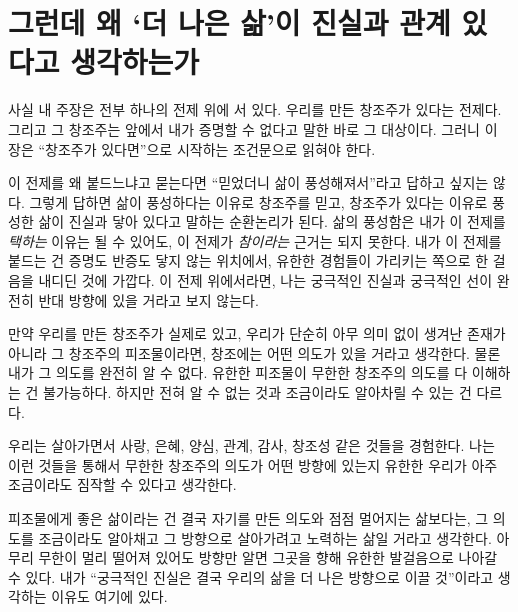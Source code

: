 \documentclass[11pt]{article}
\begin{document}
\section{그런데 왜 ‘더 나은 삶’이 진실과 관계 있다고 생각하는가}

사실 내 주장은 전부 하나의 전제 위에 서 있다. 우리를
만든 창조주가 있다는 전제다. 그리고 그 창조주는 앞에서 내가 증명할 수 없다고 말한
바로 그 대상이다. 그러니 이 장은 “창조주가 있다면”으로 시작하는
조건문으로 읽혀야 한다.

이 전제를 왜 붙드느냐고 묻는다면 “믿었더니 삶이 풍성해져서”라고 답하고 싶지는
않다. 그렇게 답하면 삶이 풍성하다는 이유로 창조주를 믿고, 창조주가 있다는 이유로
풍성한 삶이 진실과 닿아 있다고 말하는 순환논리가 된다. 삶의 풍성함은
내가 이 전제를 \emph{택하는} 이유는 될 수 있어도, 이 전제가 \emph{참이라는}
근거는 되지 못한다. 내가 이 전제를 붙드는 건 증명도 반증도 닿지 않는 위치에서,
유한한 경험들이 가리키는 쪽으로 한 걸음을 내디딘 것에 가깝다. 이 전제
위에서라면, 나는 궁극적인 진실과 궁극적인 선이 완전히 반대 방향에 있을
거라고 보지 않는다.

만약 우리를 만든 창조주가 실제로 있고, 우리가 단순히 아무 의미 없이 생겨난
존재가 아니라 그 창조주의 피조물이라면, 창조에는 어떤 의도가 있을 거라고
생각한다. 물론 내가 그 의도를 완전히 알 수 없다. 유한한 피조물이 무한한
창조주의 의도를 다 이해하는 건 불가능하다. 하지만 전혀 알 수 없는 것과 조금이라도
알아차릴 수 있는 건 다르다.

우리는 살아가면서 사랑, 은혜, 양심, 관계, 감사, 창조성 같은 것들을 경험한다.
나는 이런 것들을 통해서 무한한 창조주의 의도가 어떤 방향에 있는지 유한한 우리가
아주 조금이라도 짐작할 수 있다고 생각한다.

피조물에게 좋은 삶이라는 건 결국 자기를 만든 의도와 점점 멀어지는 삶보다는, 그
의도를 조금이라도 알아채고 그 방향으로 살아가려고 노력하는 삶일 거라고
생각한다. 아무리 무한이 멀리 떨어져 있어도 방향만 알면 그곳을 향해 유한한
발걸음으로 나아갈 수 있다. 내가 “궁극적인 진실은 결국 우리의 삶을 더 나은
방향으로 이끌 것”이라고 생각하는 이유도 여기에 있다.
\end{document}
